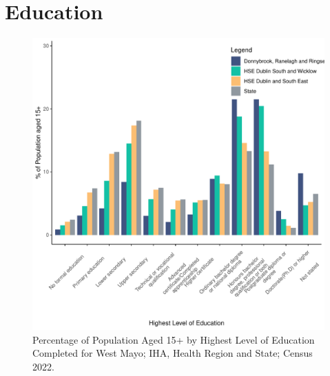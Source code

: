 \documentclass{article}
\begin{document}
\section{Education}\label{sect:Edu}
\begin{figure}[H]
	\centering
	\includegraphics[width = 120mm]{../figures/EduED.pdf}
	\caption{Percentage of Population Aged 15+ by Highest Level of Education Completed for West Mayo; IHA, Health Region and State; Census 2022.}
	\label{fig:vbnv}
	\end{figure}
\end{document}
